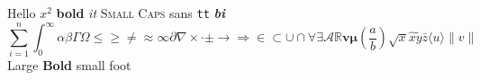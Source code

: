 \documentclass{article}
\begin{document}
Hello $x^2$ \textbf{bold} \textit{it} \textsc{Small Caps} \textsf{sans} \texttt{tt} \textbf{\textit{bi}}
\[ \sum_{i=1}^{n} \int_0^\infty \alpha\beta\Gamma\Omega \leq \geq \neq \approx \infty \partial \nabla \times \cdot \pm \to \Rightarrow \in \subset \cup \cap \forall \exists \mathcal{A}\mathbb{R}\mathbf{v}\boldsymbol{\mu} \left( \frac{a}{b} \right) \sqrt{x} \hat{x}\tilde{y}\bar{z} \langle u \rangle \| v \| \]
{\Large Large \bfseries Bold} {\small small} {\footnotesize foot}
\end{document}
